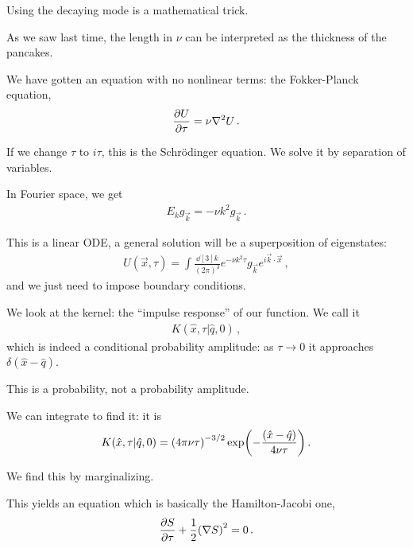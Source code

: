 \documentclass[main.tex]{subfiles}
\begin{document}

Using the decaying mode is a mathematical trick. 


As we saw last time, the length in \(\nu \) can be interpreted as the thickness of the pancakes. 

We have gotten an equation with no nonlinear terms: the Fokker-Planck equation, 
%
\begin{align}
\pdv{U}{\tau } = \nu \nabla^2 U
\,.
\end{align}

If we change \(\tau \) to \(i \tau \), this is the Schrödinger equation. 
We solve it by separation of variables. 

In Fourier space, we get 
%
\begin{align}
E_{k} g_{\vec{k}} = - \nu k^2 g_{\vec{k}}
\,.
\end{align}

This is a linear ODE, a general solution will be a superposition of eigenstates: 
%
\begin{align}
U(\vec{x}, \tau ) = \int \frac{\dd[3]{k}}{(2 \pi )^3} e^{- \nu k^2 \tau } g_{\vec{k}} e^{i \vec{k} \cdot \vec{x}}
\,,
\end{align}
%
and we just need to impose boundary conditions. 

We look at the kernel: the ``impulse response'' of our function. 
We call it 
%
\begin{align}
K ( \hat{x}, \tau | \hat{q}, 0)
\,,
\end{align}
%
which is indeed a conditional probability amplitude: as \(\tau \to 0\) it approaches \(\delta (\hat{x} - \hat{q})\). 

This is a probability, not a probability amplitude. 

We can integrate to find it: it is 
%
\begin{align}
K (\hat{x}, \tau | \hat{q}, 0) = \qty(4 \pi \nu \tau )^{-3/2} \exp( -\frac{(\hat{x} - \hat{q})}{4 \nu \tau })
\,.
\end{align}

We find this by marginalizing. 

This yields an equation which is basically the Hamilton-Jacobi one, 
%
\begin{align}
\pdv{S}{\tau } + \frac{1}{2} \qty(\nabla S)^2 = 0
\,.
\end{align}
\end{document}

